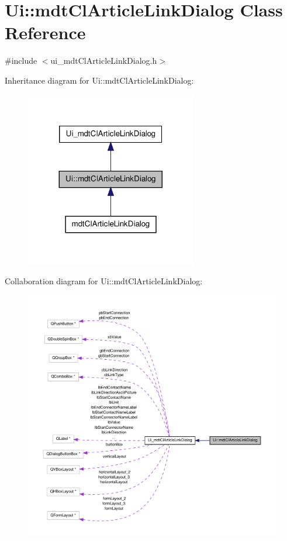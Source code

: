 \hypertarget{class_ui_1_1mdt_cl_article_link_dialog}{\section{Ui\-:\-:mdt\-Cl\-Article\-Link\-Dialog Class Reference}
\label{class_ui_1_1mdt_cl_article_link_dialog}
}


{\ttfamily \#include $<$ui\-\_\-mdt\-Cl\-Article\-Link\-Dialog.\-h$>$}



Inheritance diagram for Ui\-:\-:mdt\-Cl\-Article\-Link\-Dialog\-:
\nopagebreak
\begin{figure}[H]
\begin{center}
\leavevmode
\includegraphics[width=212pt]{class_ui_1_1mdt_cl_article_link_dialog__inherit__graph}
\end{center}
\end{figure}


Collaboration diagram for Ui\-:\-:mdt\-Cl\-Article\-Link\-Dialog\-:
\nopagebreak
\begin{figure}[H]
\begin{center}
\leavevmode
\includegraphics[width=350pt]{class_ui_1_1mdt_cl_article_link_dialog__coll__graph}
\end{center}
\end{figure}
